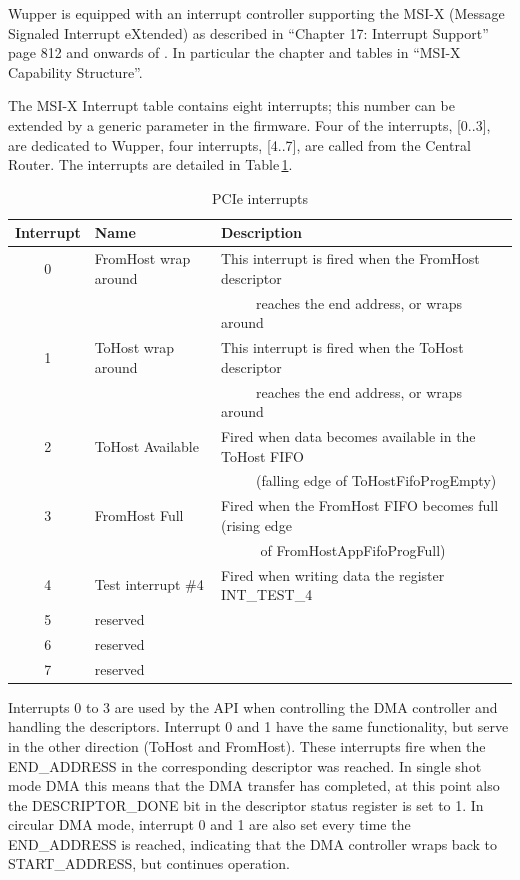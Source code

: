 Wupper is equipped with an interrupt controller supporting the MSI-X (Message Signaled Interrupt eXtended) as described in ``Chapter 17: Interrupt Support'' page 812 and onwards of \cite{PCIe_technology}. In particular the chapter and tables in ``MSI-X Capability Structure''.

The MSI-X Interrupt table contains eight interrupts; this number can be extended by a generic parameter in the firmware. Four of the interrupts, [0..3], are dedicated to Wupper, four interrupts, [4..7], are called from the Central Router.
The interrupts are detailed in Table\,\ref{tab:dma_interrupts}.


\begin{table}[htbp]
  \centering
  \caption{PCIe interrupts}
    \begin{tabular}{cll}
    \toprule
    \textbf{Interrupt} & \textbf{Name} & \textbf{Description} \\
    \midrule
    0     &  FromHost wrap around  &  This interrupt is fired when the FromHost descriptor \\
          &                        & ~~~~~reaches the end address, or wraps around  \\
    1     &  ToHost wrap around    &  This interrupt is fired when the ToHost descriptor \\
          &                        & ~~~~~reaches the end address, or wraps around  \\
    2     &  ToHost Available      &  Fired when data becomes available in the ToHost FIFO  \\
          &                        & ~~~~~(falling edge of ToHostFifoProgEmpty)  \\
    3     &  FromHost Full         &  Fired when the FromHost FIFO becomes full (rising edge \\
          &                        & ~~~~~ of FromHostAppFifoProgFull) \\
    4     &  Test interrupt \#4  &  Fired when writing data the register INT\_TEST\_4  \\
    5     &  reserved &  \\
    6     &  reserved &  \\
    7     &  reserved &  \\
    \bottomrule
    \end{tabular}%
  \label{tab:dma_interrupts}%
\end{table}%

Interrupts 0 to 3 are used by the API when controlling the DMA controller and handling the descriptors. Interrupt 0 and 1 have the same functionality, but serve in the other direction (ToHost and FromHost). These interrupts fire when the END\_ADDRESS in the corresponding descriptor was reached. In single shot mode DMA this means that the DMA transfer has completed, at this point also the DESCRIPTOR\_DONE bit in the descriptor status register is set to 1. In circular DMA mode, interrupt 0 and 1 are also set every time the END\_ADDRESS is reached, indicating that the DMA controller wraps back to START\_ADDRESS, but continues operation.


